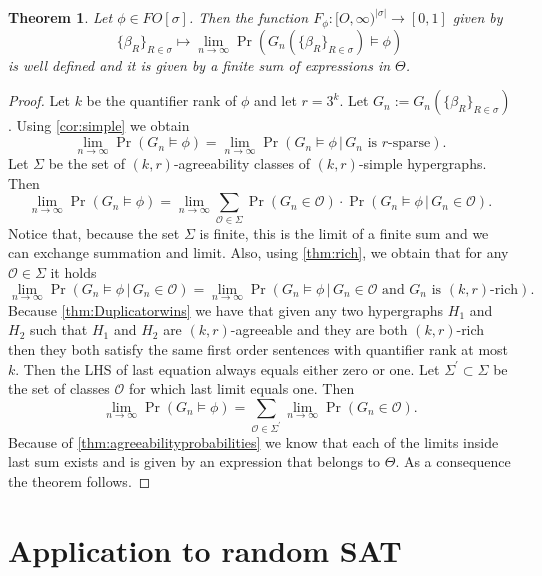 \documentclass[12pt,notitlepage,a4paper]{article}
\newtheorem{theorem}{Theorem}[section]
\theoremstyle{definition}
\newcommand{\Ln}{\lim\limits_{n\to \infty}}
\begin{document}
\begin{theorem}
	Let $\phi\in FO[\sigma]$. Then the function 
	$F_\phi: [O,\infty)^{|\sigma|}\rightarrow [0,1]$
	given by
	\[
	\{\beta_R\}_{R\in \sigma} \mapsto
	\Ln \Pr \left(
	G_n\left(\{\beta_R\}_{R\in \sigma}\right) \models \phi
	\right)
	\]
	is well defined and it is given by a finite sum of expressions
	in $\Theta$.
\end{theorem}
\begin{proof}
	Let $k$ be the quantifier rank of $\phi$ and
	let $r=3^k$. Let 
	$G_n:=G_n\left(\{\beta_R\}_{R\in \sigma}\right)$.
	Using \cref{cor:simple} we obtain
	\[
	\Ln \Pr \left(
	G_n \models \phi
	\right)=
	\Ln \Pr \left(
	G_n\models \phi
	\, \Big|
	\, G_n
	\text{ is $r$-sparse}
	\right).
	\]
	Let $\Sigma$ be the set of $(k,r)$-agreeability classes of 
	$(k,r)$-simple hypergraphs. 
	Then
	\begin{equation} \label{eq:aux1}
	\Ln \Pr \left(
	G_n \models \phi
	\right)=
	\Ln
	\sum_{\mathcal{O}\in \Sigma} \Pr\left(
	G_n\in \mathcal{O}
	\right) \cdot 
	\Pr\left(
	G_n\models \phi \,
	\Big| \,
	G_n\in \mathcal{O}
	\right).
	\end{equation}
	Notice that, because the set $\Sigma$ is finite, 
	this is the limit of a finite sum and we can exchange
	summation and limit. Also, 
	using \cref{thm:rich}, we obtain that for any $\mathcal{O}\in \Sigma$
	it holds
	\[
	\Ln \Pr\left(
	G_n\models \phi \,
	\Big| \,
	G_n\in \mathcal{O}
	\right) = 
		\Ln \Pr\left(
	G_n\models \phi \,
	\Big| \,
	G_n\in \mathcal{O}
 	\text{ and } G_n \text{ 
	is $(k,r)$-rich} 	\right).
	\]
	Because \cref{thm:Duplicatorwins} we have that given any two hypergraphs
	$H_1$ and $H_2$ such that $H_1$ and $H_2$ are $(k,r)$-agreeable and they
	are both $(k,r)$-rich then they both satisfy the same first order sentences
	with quantifier rank at most $k$. Then the LHS of last equation always equals
	either zero or one. Let $\Sigma^\prime\subset \Sigma$ be the set of classes 
	$\mathcal{O}$ for which last limit equals one. Then
	\[
	\Ln \Pr \left(
	G_n \models \phi
	\right)=
	\sum_{\mathcal{O}\in \Sigma^\prime}
	\Ln \Pr\left(
	G_n \in \mathcal{O}
	\right).		
	\]
	Because of \cref{thm:agreeabilityprobabilities} we know that
	each of the limits inside last sum exists and is given by
	an expression that belongs to $\Theta$. As a consequence the
	theorem follows. 	
\end{proof}

\section{Application to random SAT}
\end{document}
